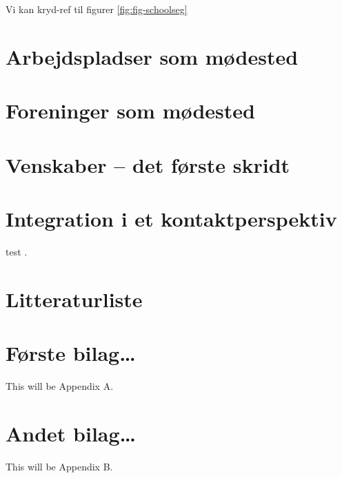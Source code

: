 \documentclass[
]{book}
\begin{document}
Vi kan kryd-ref til figurer \ref{fig:fig-schoolseg}

\hypertarget{kap4}{%
\chapter{Arbejdspladser som mødested}\label{kap4}}

\hypertarget{kap5}{%
\chapter{Foreninger som mødested}\label{kap5}}

\hypertarget{kap6}{%
\chapter{Venskaber -- det første skridt}\label{kap6}}

\hypertarget{kap7}{%
\chapter{Integration i et kontaktperspektiv}\label{kap7}}

test \citep{xie2015}.

\hypertarget{litteraturliste}{%
\chapter*{Litteraturliste}\label{litteraturliste}}

\hypertarget{appendix-bilag}{%
\appendix}


\hypertarget{bilag1}{%
\chapter{Første bilag\ldots{}}\label{bilag1}}

This will be Appendix A.

\hypertarget{bilag2}{%
\chapter{Andet bilag\ldots{}}\label{bilag2}}

This will be Appendix B.

  
\end{document}
